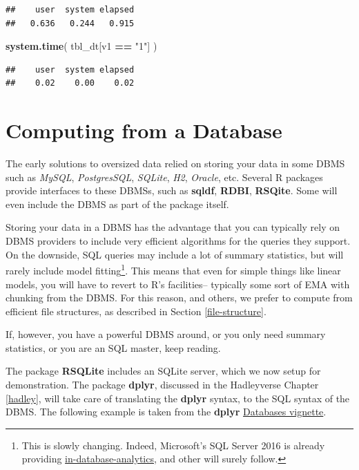 \documentclass[]{book}
\newenvironment{Shaded}{\begin{snugshade}}{\end{snugshade}}
\newcommand{\KeywordTok}[1]{\textcolor[rgb]{0.13,0.29,0.53}{\textbf{#1}}}
\newcommand{\StringTok}[1]{\textcolor[rgb]{0.31,0.60,0.02}{#1}}
\newcommand{\OperatorTok}[1]{\textcolor[rgb]{0.81,0.36,0.00}{\textbf{#1}}}
\newcommand{\NormalTok}[1]{#1}
\theoremstyle{definition}
\theoremstyle{definition}
\theoremstyle{definition}
\theoremstyle{remark}
\begin{document}
\begin{verbatim}
##    user  system elapsed 
##   0.636   0.244   0.915
\end{verbatim}

\begin{Shaded}
\begin{Highlighting}[]
\KeywordTok{system.time}\NormalTok{( }
\NormalTok{  tbl_dt[v1 }\OperatorTok{==}\StringTok{ "1"}\NormalTok{] }
\NormalTok{  )}
\end{Highlighting}
\end{Shaded}

\begin{verbatim}
##    user  system elapsed 
##    0.02    0.00    0.02
\end{verbatim}

\section{Computing from a Database}\label{computing-from-a-database}

The early solutions to oversized data relied on storing your data in
some DBMS such as \emph{MySQL}, \emph{PostgresSQL}, \emph{SQLite},
\emph{H2}, \emph{Oracle}, etc. Several R packages provide interfaces to
these DBMSs, such as \textbf{sqldf}, \textbf{RDBI}, \textbf{RSQite}.
Some will even include the DBMS as part of the package itself.

Storing your data in a DBMS has the advantage that you can typically
rely on DBMS providers to include very efficient algorithms for the
queries they support. On the downside, SQL queries may include a lot of
summary statistics, but will rarely include model fitting\footnote{This
  is slowly changing. Indeed, Microsoft's SQL Server 2016 is already
  providing
  \href{https://blogs.technet.microsoft.com/dataplatforminsider/2016/03/29/in-database-advanced-analytics-with-r-in-sql-server-2016/}{in-database-analytics},
  and other will surely follow.}. This means that even for simple things
like linear models, you will have to revert to R's facilities--
typically some sort of EMA with chunking from the DBMS. For this reason,
and others, we prefer to compute from efficient file structures, as
described in Section \ref{file-structure}.

If, however, you have a powerful DBMS around, or you only need summary
statistics, or you are an SQL master, keep reading.

The package \textbf{RSQLite} includes an SQLite server, which we now
setup for demonstration. The package \textbf{dplyr}, discussed in the
Hadleyverse Chapter \ref{hadley}, will take care of translating the
\textbf{dplyr} syntax, to the SQL syntax of the DBMS. The following
example is taken from the \textbf{dplyr}
\href{https://cran.r-project.org/web/packages/dplyr/vignettes/databases.html}{Databases
vignette}.
\end{document}
